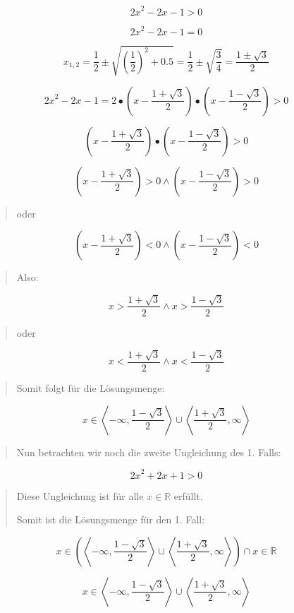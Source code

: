 \documentclass[a4paper, 12pt]{book}
\begin{document}
\[{2x}^{2} - 2x - 1 > 0\]

\[{2x}^{2} - 2x - 1 = 0\]

\[x_{1,2} = \frac{1}{2} \pm \sqrt{\left( \frac{1}{2} \right)^{2} + 0.5} = \frac{1}{2} \pm \sqrt{\frac{3}{4}} = \frac{1 \pm \sqrt{3}}{2}\]

\[{2x}^{2} - 2x - 1 = 2 \bullet (x - \frac{1 + \sqrt{3}}{2}) \bullet (x - \frac{1 - \sqrt{3}}{2}) > 0\]

\[(x - \frac{1 + \sqrt{3}}{2}) \bullet (x - \frac{1 - \sqrt{3}}{2}) > 0\]

\[(x - \frac{1 + \sqrt{3}}{2}) > 0 \land (x - \frac{1 - \sqrt{3}}{2}) > 0\]

\begin{quote}
oder
\end{quote}

\[(x - \frac{1 + \sqrt{3}}{2}) < 0 \land (x - \frac{1 - \sqrt{3}}{2}) < 0\]

\begin{quote}
Also:
\end{quote}

\[x > \frac{1 + \sqrt{3}}{2} \land x > \frac{1 - \sqrt{3}}{2}\]

\begin{quote}
oder
\end{quote}

\[x < \frac{1 + \sqrt{3}}{2} \land x < \frac{1 - \sqrt{3}}{2}\]

\begin{quote}
Somit folgt für die Lösungsmenge:
\end{quote}

\[x \in \left\langle  - \infty,\frac{1 - \sqrt{3}}{2} \right\rangle \cup \left\langle \frac{1 + \sqrt{3}}{2},\infty \right\rangle\]

\begin{quote}
Nun betrachten wir noch die zweite Ungleichung des 1. Falls:
\end{quote}

\[{2x}^{2} + 2x + 1 > 0\]

\begin{quote}
Diese Ungleichung ist für alle \(x\mathbb{ \in R}\) erfüllt.

Somit ist die Lösungsmenge für den 1. Fall:
\end{quote}

\[x \in (\left\langle  - \infty,\frac{1 - \sqrt{3}}{2} \right\rangle \cup \left\langle \frac{1 + \sqrt{3}}{2},\infty \right\rangle) \cap x\mathbb{ \in R}\]

\[x \in \left\langle  - \infty,\frac{1 - \sqrt{3}}{2} \right\rangle \cup \left\langle \frac{1 + \sqrt{3}}{2},\infty \right\rangle\]
\end{document}
